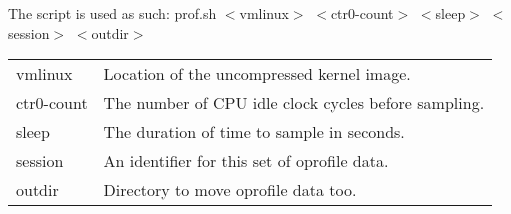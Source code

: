 \documentclass{article}
\begin{document}
The script is used as such:
	prof.sh $<$vmlinux$>$ $<$ctr0-count$>$ $<$sleep$>$ $<$session$>$ $<$outdir$>$ \\

\begin{tabular}[c]{ll}
vmlinux & Location of the uncompressed kernel image. \\
ctr0-count & The number of CPU idle clock cycles before sampling. \\
sleep & The duration of time to sample in seconds. \\
session & An identifier for this set of oprofile data. \\
outdir & Directory to move oprofile data too. \\
\end{tabular}
\end{document}
